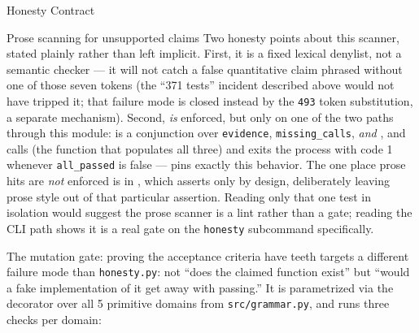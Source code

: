 \documentclass[
  ignorenonframetext,
]{beamer}
\begin{document}
\begin{frame}{Honesty Contract}
\begin{block}{Prose scanning for unsupported claims}
Two honesty points about this scanner, stated plainly rather than left
implicit. First, it is a fixed lexical denylist, not a semantic checker
--- it will not catch a false quantitative claim phrased without one of
those seven tokens (the ``371 tests'' incident described above would not
have tripped it; that failure mode is closed instead by the \texttt{493}
token substitution, a separate mechanism). Second,
 \emph{is} enforced, but only on one of the
two paths through this module:  is a
conjunction over \texttt{evidence}, \texttt{missing\_calls}, \emph{and}
, and 
calls  (the function that populates all three)
and exits the process with code 1 whenever \texttt{all\_passed} is false
---  pins
exactly this behavior. The one place prose hits are \emph{not} enforced
is  in
, which asserts only
 by design, deliberately leaving prose
style out of that particular assertion. Reading only that one test in
isolation would suggest the prose scanner is a lint rather than a gate;
reading the CLI path shows it is a real gate on the \texttt{honesty}
subcommand specifically.
\end{block}

\begin{block}{The mutation gate: proving the acceptance criteria have
teeth}
\protect{}\label{the-mutation-gate-proving-the-acceptance-criteria-have-teeth}
 targets a different failure mode than
\texttt{honesty.py}: not ``does the claimed function exist'' but ``would
a fake implementation of it get away with passing.'' It is parametrized
via the
decorator over all 5 primitive domains from \texttt{src/grammar.py}, and
runs three checks per domain:


\end{block}
\end{frame}
\end{document}
